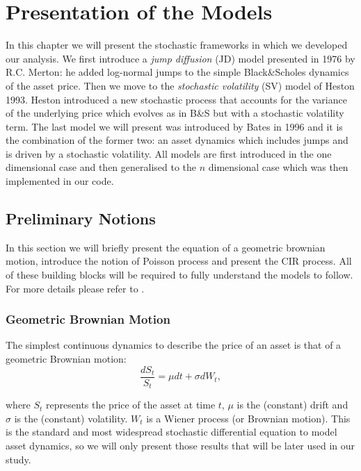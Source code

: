 \chapter{Presentation of the Models}
\label{chpr:models}
In this chapter we will present the stochastic frameworks in which we developed our analysis. We first introduce a \textit{jump diffusion} (JD) model presented in 1976 by R.C. Merton: he added log-normal jumps to the simple Black\&Scholes dynamics of the asset price. Then we move to the \textit{stochastic volatility} (SV) model of Heston 1993. Heston introduced a new stochastic process that accounts for the variance of the underlying price which evolves as in B\&S  but with a stochastic volatility term.
The last model we will present was introduced by Bates in 1996 and it is the combination of the former two: an asset dynamics which includes jumps and is driven by a stochastic volatility.
All models are first introduced in the one dimensional case and then generalised to the $n$ dimensional case which was then implemented in our code.

\bigskip

\section{Preliminary Notions}
\label{sec:notions}
In this section we will briefly present the equation of a geometric brownian motion, introduce the notion of Poisson process and present the 
CIR process. All of these building blocks will be required to fully understand the models to follow.
For more details  please refer to \citep{TANKOV2015}.



\subsection{Geometric Brownian Motion}
The simplest continuous dynamics to describe the price of an asset is that of a geometric Brownian motion:
\begin{equation}
	\label{eq:GBM}
	\frac{dS_t}{S_t} = \mu dt + \sigma dW_t,
\end{equation}

\noindent
where $S_t$ represents the price of the asset at time $t$, $\mu$ is the (constant) drift and $\sigma$ is the (constant) volatility. $W_t$ is a Wiener process (or Brownian motion).
This is the standard and most widespread stochastic differential equation to model asset dynamics, so we will only present those results that will be later used in our study.


